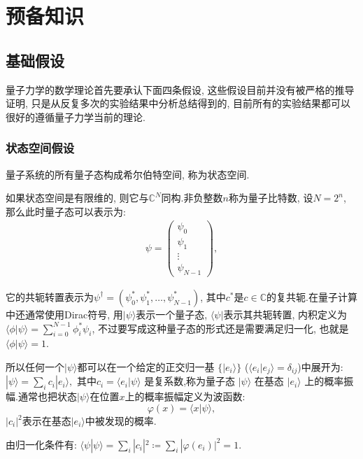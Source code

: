 \chapter{预备知识}


\section{基础假设}

量子力学的数学理论首先要承认下面四条假设, 这些假设目前并没有被严格的推导证明, 只是从反复多次的实验结果中分析总结得到的, 目前所有的实验结果都可以很好的遵循量子力学当前的理论.

\subsection{状态空间假设}
量子系统的所有量子态构成希尔伯特空间, 称为状态空间.

如果状态空间是有限维的, 则它与$\mathbb{C}^N$同构.非负整数$n$称为量子比特数, 设$N=2^n$, 那么此时量子态可以表示为:
\begin{align*}
	\psi = \begin{pmatrix}
		\psi_0 \\
		\psi_1 \\
		\vdots \\
		\psi_{N-1}
	\end{pmatrix},
\end{align*}

它的共轭转置表示为$\psi^\dagger = (\psi_0^*, \psi_1^*, \ldots, \psi_{N-1}^*)$, 其中$c^*$是$c\in\mathbb{C}$的复共轭.在量子计算中还通常使用Dirac符号, 用$|\psi\rangle$表示一个量子态, $\langle\psi|$表示其共轭转置, 内积定义为$\langle\phi|\psi\rangle = \sum_{i=0}^{N-1} \phi_i^* \psi_i$, 不过要写成这种量子态的形式还是需要满足归一化, 也就是$\langle\phi|\psi\rangle =1$.

所以任何一个$|\psi\rangle$都可以在一个给定的正交归一基 $ \{|e_i\rangle\} $ ($ \langle e_{i}|e_{j}\rangle =\delta _{ij}$)中展开为:
$
|\psi \rangle = \sum_i c_i |e_i\rangle,
$
其中$ c_i = \langle e_i | \psi \rangle $ 是复系数,称为量子态 $ |\psi \rangle $ 在基态 $ |e_i\rangle $ 上的概率振幅.通常也把状态$ |\psi \rangle $在位置$x$上的概率振幅定义为波函数:
\begin{equation}
	\varphi(x) = \langle x | \psi \rangle	,
\end{equation}
$ |c_i|^2$表示在基态$|e_i\rangle$中被发现的概率.

由归一化条件有:
$
\langle \psi | \psi \rangle = \sum_i |c_i|^2 \coloneqq \sum_i |\varphi(e_i)|^2 = 1.
$

